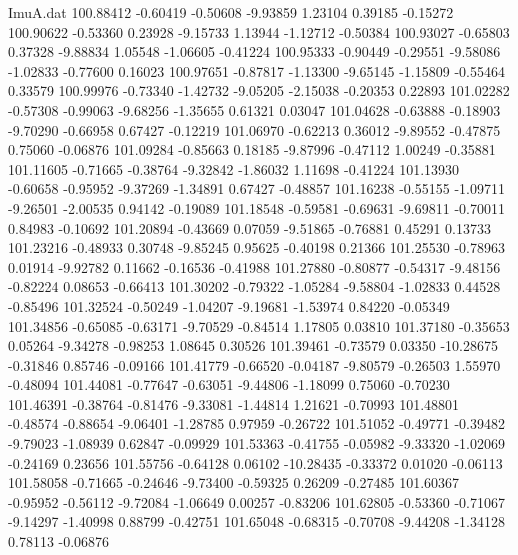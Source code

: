 \begin{filecontents}{ImuA.dat}
 100.88412   -0.60419   -0.50608   -9.93859    1.23104    0.39185   -0.15272
 100.90622   -0.53360    0.23928   -9.15733    1.13944   -1.12712   -0.50384
 100.93027   -0.65803    0.37328   -9.88834    1.05548   -1.06605   -0.41224
 100.95333   -0.90449   -0.29551   -9.58086   -1.02833   -0.77600    0.16023
 100.97651   -0.87817   -1.13300   -9.65145   -1.15809   -0.55464    0.33579
 100.99976   -0.73340   -1.42732   -9.05205   -2.15038   -0.20353    0.22893
 101.02282   -0.57308   -0.99063   -9.68256   -1.35655    0.61321    0.03047
 101.04628   -0.63888   -0.18903   -9.70290   -0.66958    0.67427   -0.12219
 101.06970   -0.62213    0.36012   -9.89552   -0.47875    0.75060   -0.06876
 101.09284   -0.85663    0.18185   -9.87996   -0.47112    1.00249   -0.35881
 101.11605   -0.71665   -0.38764   -9.32842   -1.86032    1.11698   -0.41224
 101.13930   -0.60658   -0.95952   -9.37269   -1.34891    0.67427   -0.48857
 101.16238   -0.55155   -1.09711   -9.26501   -2.00535    0.94142   -0.19089
 101.18548   -0.59581   -0.69631   -9.69811   -0.70011    0.84983   -0.10692
 101.20894   -0.43669    0.07059   -9.51865   -0.76881    0.45291    0.13733
 101.23216   -0.48933    0.30748   -9.85245    0.95625   -0.40198    0.21366
 101.25530   -0.78963    0.01914   -9.92782    0.11662   -0.16536   -0.41988
 101.27880   -0.80877   -0.54317   -9.48156   -0.82224    0.08653   -0.66413
 101.30202   -0.79322   -1.05284   -9.58804   -1.02833    0.44528   -0.85496
 101.32524   -0.50249   -1.04207   -9.19681   -1.53974    0.84220   -0.05349
 101.34856   -0.65085   -0.63171   -9.70529   -0.84514    1.17805    0.03810
 101.37180   -0.35653    0.05264   -9.34278   -0.98253    1.08645    0.30526
 101.39461   -0.73579    0.03350  -10.28675   -0.31846    0.85746   -0.09166
 101.41779   -0.66520   -0.04187   -9.80579   -0.26503    1.55970   -0.48094
 101.44081   -0.77647   -0.63051   -9.44806   -1.18099    0.75060   -0.70230
 101.46391   -0.38764   -0.81476   -9.33081   -1.44814    1.21621   -0.70993
 101.48801   -0.48574   -0.88654   -9.06401   -1.28785    0.97959   -0.26722
 101.51052   -0.49771   -0.39482   -9.79023   -1.08939    0.62847   -0.09929
 101.53363   -0.41755   -0.05982   -9.33320   -1.02069   -0.24169    0.23656
 101.55756   -0.64128    0.06102  -10.28435   -0.33372    0.01020   -0.06113
 101.58058   -0.71665   -0.24646   -9.73400   -0.59325    0.26209   -0.27485
 101.60367   -0.95952   -0.56112   -9.72084   -1.06649    0.00257   -0.83206
 101.62805   -0.53360   -0.71067   -9.14297   -1.40998    0.88799   -0.42751
 101.65048   -0.68315   -0.70708   -9.44208   -1.34128    0.78113   -0.06876

\end{filecontents}
